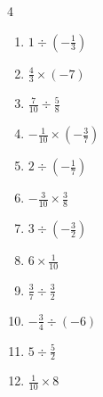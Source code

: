 \begin{multicols}{4}
\begin{enumerate}

  \item $\displaystyle 1\div{}\left(-\frac{1}{3}\right)$

        \phantom{$\displaystyle =-3$}

  \item $\displaystyle \frac{4}{3}\times{}\left(-7\right)$


  \item $\displaystyle \frac{7}{10}\div{}\frac{5}{8}$


\columnbreak %

  \item $\displaystyle -\frac{1}{10}\times{}\left(-\frac{3}{7}\right)$


  \item $\displaystyle 2\div{}\left(-\frac{1}{7}\right)$

        \phantom{$\displaystyle =-14$}

  \item $\displaystyle -\frac{3}{10}\times{}\frac{3}{8}$


  \item $\displaystyle 3\div{}\left(-\frac{3}{2}\right)$

        \phantom{$\displaystyle =-2$}

  \item $\displaystyle 6\times{}\frac{1}{10}$


  \item $\displaystyle \frac{3}{7}\div{}\frac{3}{2}$


  \item $\displaystyle -\frac{3}{4}\div{}\left(-6\right)$


  \item $\displaystyle 5\div{}\frac{5}{2}$

        \phantom{$\displaystyle =2$}

  \item $\displaystyle \frac{1}{10}\times{}8$


\end{enumerate}
\end{multicols}
